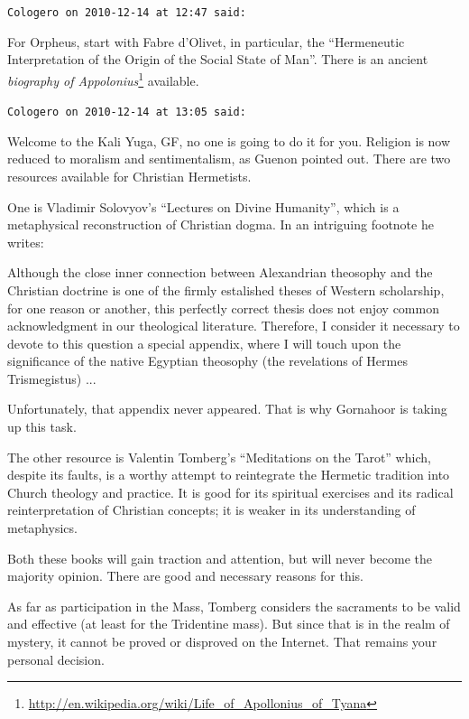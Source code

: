 \begin{footnotesize}
\begin{sffamily}
\hfill

\texttt{Cologero on 2010-12-14 at 12:47 said:}

For Orpheus, start with Fabre d'Olivet, in particular, the ``Hermeneutic Interpretation of the Origin of the Social State of Man''. There is an ancient \textit{biography of Appolonius}\footnote{\url{http://en.wikipedia.org/wiki/Life\_of\_Apollonius\_of\_Tyana}} available.

\hfill

\texttt{Cologero on 2010-12-14 at 13:05 said:}

Welcome to the Kali Yuga, GF, no one is going to do it for you. Religion is now reduced to moralism and sentimentalism, as Guenon pointed out. There are two resources available for Christian Hermetists.

One is Vladimir Solovyov's ``Lectures on Divine Humanity'', which is a metaphysical reconstruction of Christian dogma. In an intriguing footnote he writes:

\begin{quotex}\footnotesize
Although the close inner connection between Alexandrian theosophy and the Christian doctrine is one of the firmly estalished theses of Western scholarship, for one reason or another, this perfectly correct thesis does not enjoy common acknowledgment in our theological literature. Therefore, I consider it necessary to devote to this question a special appendix, where I will touch upon the significance of the native Egyptian theosophy (the revelations of Hermes Trismegistus) ... 
\end{quotex}


Unfortunately, that appendix never appeared. That is why Gornahoor is taking up this task.

The other resource is Valentin Tomberg's ``Meditations on the Tarot'' which, despite its faults, is a worthy attempt to reintegrate the Hermetic tradition into Church theology and practice. It is good for its spiritual exercises and its radical reinterpretation of Christian concepts; it is weaker in its understanding of metaphysics.

Both these books will gain traction and attention, but will never become the majority opinion. There are good and necessary reasons for this.

As far as participation in the Mass, Tomberg considers the sacraments to be valid and effective (at least for the Tridentine mass). But since that is in the realm of mystery, it cannot be proved or disproved on the Internet. That remains your personal decision.


\end{sffamily}
\end{footnotesize}
